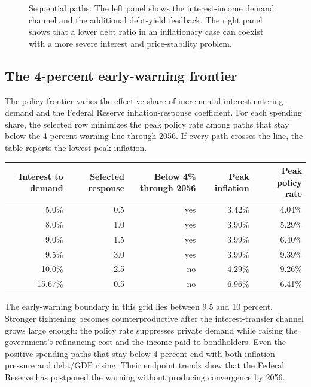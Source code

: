 \documentclass[11pt]{article}
\begin{document}
\begin{figure}[ht]
\caption{Sequential paths.  The left panel shows the interest-income demand channel and the
additional debt-yield feedback.  The right panel shows that a lower debt ratio in an
inflationary case can coexist with a more severe interest and price-stability problem.}
\end{figure}

\subsection*{The 4-percent early-warning frontier}

The policy frontier varies the effective share of incremental interest entering demand and
the Federal Reserve inflation-response coefficient.  For each spending share, the selected
row minimizes the peak policy rate among paths that stay below the 4-percent warning line
through 2056.  If every path crosses the line, the table reports the lowest peak inflation.

\begin{center}
\begin{tabular}{rrrrr}
\toprule
Interest to demand & Selected response & Below 4\% through 2056 & Peak inflation & Peak policy rate \\
\midrule
5.0\%  & 0.5 & yes & 3.42\% & 4.04\% \\
8.0\%  & 1.0 & yes & 3.90\% & 5.29\% \\
9.0\%  & 1.5 & yes & 3.99\% & 6.40\% \\
9.5\%  & 3.0 & yes & 3.99\% & 9.39\% \\
10.0\% & 2.5 & no  & 4.29\% & 9.26\% \\
15.67\% & 0.5 & no & 6.96\% & 6.41\% \\
\bottomrule
\end{tabular}
\end{center}

The early-warning boundary in this grid lies between 9.5 and 10 percent.  Stronger
tightening becomes counterproductive after the interest-transfer channel grows large enough:
the policy rate suppresses private demand while raising the government's refinancing cost
and the income paid to bondholders.  Even the positive-spending paths that stay below 4
percent end with both inflation pressure and debt/GDP rising.  Their endpoint trends show
that the Federal Reserve has postponed the warning without producing convergence by 2056.
\end{document}
